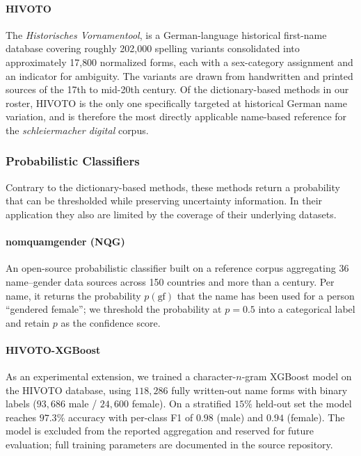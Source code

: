 \documentclass{eceasst}
\begin{document}
\paragraph{HIVOTO} The \emph{Historisches Vornamentool}, is a German-language historical first-name database covering roughly 202{,}000 spelling variants consolidated into approximately 17{,}800 normalized forms, each with a sex-category assignment and an indicator for ambiguity. The variants are drawn from handwritten and printed sources of the 17th to mid-20th century. Of the dictionary-based methods in our roster, HIVOTO is the only one specifically targeted at historical German name variation, and is therefore the most directly applicable name-based reference for the \textit{schleiermacher digital} corpus.~\cite{liebing_historisches_2026}

\subsubsection{Probabilistic Classifiers}
Contrary to the dictionary-based methods, these methods return a probability that can be thresholded while preserving uncertainty information. In their application they also are limited by the coverage of their underlying datasets.

\paragraph{nomquamgender (NQG)} An open-source probabilistic classifier built on a reference corpus aggregating 36 name--gender data sources across 150 countries and more than a century. Per name, it returns the probability $p(\text{gf})$ that the name has been used for a person ``gendered female''; we threshold the probability at $p = 0.5$ into a categorical label and retain $p$ as the confidence score.~\cite{buskirk_open-source_2023}

\paragraph{HIVOTO-XGBoost} As an experimental extension, we trained a character-$n$-gram XGBoost model on the HIVOTO database, using $118{,}286$ fully written-out name forms with binary labels ($93{,}686$ male / $24{,}600$ female). On a stratified $15\%$ held-out set the model reaches $97.3\%$ accuracy with per-class F1 of $0.98$ (male) and $0.94$ (female). The model is excluded from the reported aggregation and reserved for future evaluation; full training parameters are documented in the source repository.
\end{document}
